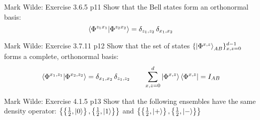 \documentclass[a4paper, 11pt]{article}
\begin{document}

\begin{problem}{%
		Mark Wilde: Exercise 3.6.5
	}{p11%
	}
	Show that the Bell states form an orthonormal basis: $$\bra{\Phi^{z_1x_1}}\ket{\Phi^{z_2x_2}}=\delta_{z_1,z_2}\,\delta_{x_1,x_2}$$
\end{problem}


\begin{problem}{%
		Mark Wilde: Exercise 3.7.11
	}{p12%
	}
	 Show that the set of states $\{\ket{\Phi^{x,z}}_{AB}\}^{d-1}_{x,z=0}$ forms a complete, orthonormal basis:$$\bra{\Phi^{x_1,z_1}}\ket{\Phi^{x_2,z_2}}=\delta_{x_1,x_2}\,\delta_{z_1,z_2}\qquad \sum_{x,z=0}^d\ket{\Phi^{x,z}}\bra{\Phi^{x,z}}=I_{AB}$$
\end{problem}


\begin{problem}{%
		Mark Wilde: Exercise 4.1.5
	}{p13%
	}
	 Show that the following ensembles have the same density operator: $\left\{\left\{\frac12,\ket{0}\right\},\left\{\frac12,\ket{1}\right\}\right\}$ and $\left\{\left\{\frac12,\ket{+}\right\},\left\{\frac12,\ket{-}\right\}\right\}$
\end{problem}

\end{document}
